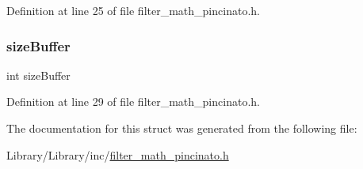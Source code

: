 Definition at line 25 of file filter\+\_\+math\+\_\+pincinato.\+h.

\mbox{\label{struct_biquads_filter___a145948232f729807d798ee4339711815}} 
\subsubsection{\texorpdfstring{size\+Buffer}{sizeBuffer}}
{\footnotesize\ttfamily int size\+Buffer}



Definition at line 29 of file filter\+\_\+math\+\_\+pincinato.\+h.



The documentation for this struct was generated from the following file\+:\begin{DoxyCompactItemize}
\item 
Library/\+Library/inc/\mbox{\hyperlink{filter__math__pincinato_8h}{filter\+\_\+math\+\_\+pincinato.\+h}}\end{DoxyCompactItemize}
